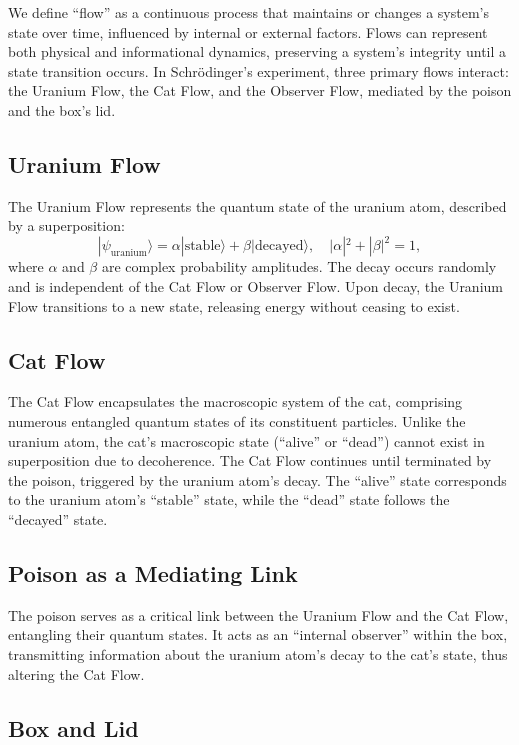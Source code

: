 \documentclass[12pt]{article}
\begin{document}
We define ``flow'' as a continuous process that maintains or changes a system's state over time, influenced by internal or external factors. Flows can represent both physical and informational dynamics, preserving a system's integrity until a state transition occurs. In Schrödinger's experiment, three primary flows interact: the Uranium Flow, the Cat Flow, and the Observer Flow, mediated by the poison and the box's lid.

\subsection{Uranium Flow}

The Uranium Flow represents the quantum state of the uranium atom, described by a superposition:
\[
|\psi_{\mathrm{uranium}}\rangle = \alpha |\mathrm{stable}\rangle + \beta |\mathrm{decayed}\rangle, \quad |\alpha|^2 + |\beta|^2 = 1,
\]
where \(\alpha\) and \(\beta\) are complex probability amplitudes. The decay occurs randomly and is independent of the Cat Flow or Observer Flow. Upon decay, the Uranium Flow transitions to a new state, releasing energy without ceasing to exist.

\subsection{Cat Flow}

The Cat Flow encapsulates the macroscopic system of the cat, comprising numerous entangled quantum states of its constituent particles. Unlike the uranium atom, the cat's macroscopic state (``alive'' or ``dead'') cannot exist in superposition due to decoherence. The Cat Flow continues until terminated by the poison, triggered by the uranium atom's decay. The ``alive'' state corresponds to the uranium atom's ``stable'' state, while the ``dead'' state follows the ``decayed'' state.

\subsection{Poison as a Mediating Link}

The poison serves as a critical link between the Uranium Flow and the Cat Flow, entangling their quantum states. It acts as an ``internal observer'' within the box, transmitting information about the uranium atom's decay to the cat's state, thus altering the Cat Flow.

\subsection{Box and Lid}
\end{document}

